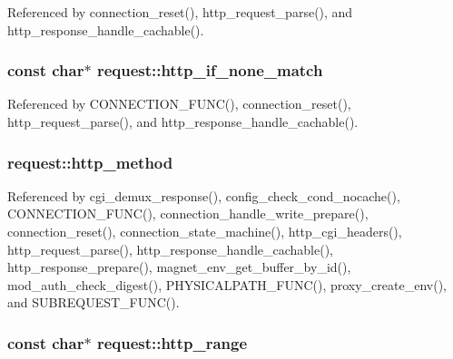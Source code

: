 Referenced by connection\-\_\-reset(), http\-\_\-request\-\_\-parse(), and http\-\_\-response\-\_\-handle\-\_\-cachable().

\hypertarget{structrequest_ac1ffb85ee71c43a64a59606d8f421a07}{
\subsubsection[{http\-\_\-if\-\_\-none\-\_\-match}]{\setlength{\rightskip}{0pt plus 5cm}const char$\ast$ request\-::http\-\_\-if\-\_\-none\-\_\-match}}\label{structrequest_ac1ffb85ee71c43a64a59606d8f421a07}


Referenced by C\-O\-N\-N\-E\-C\-T\-I\-O\-N\-\_\-\-F\-U\-N\-C(), connection\-\_\-reset(), http\-\_\-request\-\_\-parse(), and http\-\_\-response\-\_\-handle\-\_\-cachable().

\hypertarget{structrequest_a1166fb8addcfc27011d8d0002761c4a0}{
\subsubsection[{http\-\_\-method}]{ request\-::http\-\_\-method}}\label{structrequest_a1166fb8addcfc27011d8d0002761c4a0}


Referenced by cgi\-\_\-demux\-\_\-response(), config\-\_\-check\-\_\-cond\-\_\-nocache(), C\-O\-N\-N\-E\-C\-T\-I\-O\-N\-\_\-\-F\-U\-N\-C(), connection\-\_\-handle\-\_\-write\-\_\-prepare(), connection\-\_\-reset(), connection\-\_\-state\-\_\-machine(), http\-\_\-cgi\-\_\-headers(), http\-\_\-request\-\_\-parse(), http\-\_\-response\-\_\-handle\-\_\-cachable(), http\-\_\-response\-\_\-prepare(), magnet\-\_\-env\-\_\-get\-\_\-buffer\-\_\-by\-\_\-id(), mod\-\_\-auth\-\_\-check\-\_\-digest(), P\-H\-Y\-S\-I\-C\-A\-L\-P\-A\-T\-H\-\_\-\-F\-U\-N\-C(), proxy\-\_\-create\-\_\-env(), and S\-U\-B\-R\-E\-Q\-U\-E\-S\-T\-\_\-\-F\-U\-N\-C().

\hypertarget{structrequest_aadf126c51c054dc49c0ef3479c264f15}{
\subsubsection[{http\-\_\-range}]{\setlength{\rightskip}{0pt plus 5cm}const char$\ast$ request\-::http\-\_\-range}}\label{structrequest_aadf126c51c054dc49c0ef3479c264f15}


